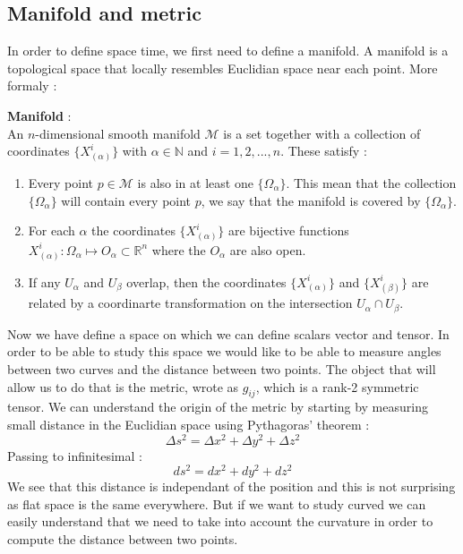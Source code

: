 \documentclass[a4paper,12pt]{article}
\theoremstyle{definition}
\begin{document}
\subsection{Manifold and metric}
In order to define space time, we first need to define a manifold.
A manifold is a topological space that locally resembles Euclidian space near each point.
More formaly :
\begin{definition}
	\textbf{Manifold} :\\
	An $n$-dimensional smooth manifold $\mathcal{M}$ is a set together with a collection of coordinates $\{ X^i_{(\alpha)}\}$
	with $\alpha \in \mathbb{N}$ and $i=1,2,...,n$. These satisfy :
	\begin{enumerate}
		\item Every point $p\in\mathcal{M}$ is also in at least one $\{\Omega_\alpha\}$.
		This mean that the collection $\{\Omega_\alpha\}$ will contain every point $p$,
		we say that the manifold is covered by $\{\Omega_\alpha\}$.
		\item For each $\alpha$ the coordinates $\{ X^i_{(\alpha)}\}$ are bijective functions $X^i_{(\alpha)}:\Omega_\alpha \mapsto O_\alpha \subset \mathbb{R}^n$
		where the $O_\alpha$ are also open.
		\item If any $U_\alpha$ and $U_\beta$ overlap, then the coordinates $\{ X^i_{(\alpha)}\}$ and $\{ X^i_{(\beta)}\}$
		are related by a coordinarte transformation on the intersection $U_\alpha \cap U_\beta$.
	\end{enumerate}
\end{definition}
Now we have define a space on which we can define scalars vector and tensor.
In order to be able to study this space we would like to be able to measure angles between two curves and the distance between two points.
The object that will allow us to do that is the metric, wrote as $g_{ij}$, which is a rank-2 symmetric tensor.
We can understand the origin of the metric by starting by measuring small distance in the Euclidian space using Pythagoras' theorem :
\begin{equation*}
	\Delta s^2= \Delta x^2 + \Delta y^2 + \Delta z^2
\end{equation*}
Passing to infinitesimal :
\begin{equation}\label{dist}
	ds^2= dx^2 + dy^2 + dz^2
\end{equation}
We see that this distance is independant of the position and this is not surprising as flat space is the same everywhere.
But if we want to study curved we can easily understand that we need to take into account the curvature in order to compute the distance between two points.\\
\end{document}
